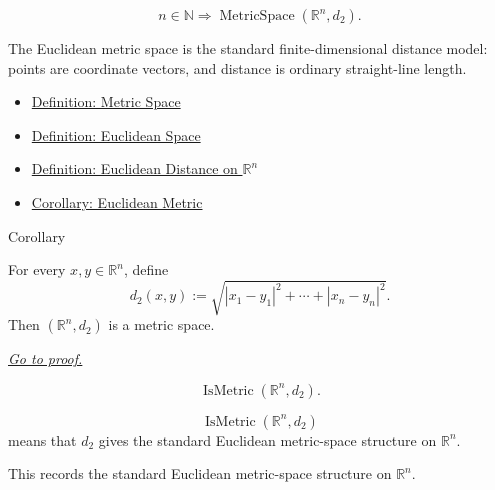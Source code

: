 \begin{remark*}
\[
n\in\mathbb{N}
\Longrightarrow
\operatorname{MetricSpace}(\mathbb{R}^n,d_2).
\]
\end{remark*}

\begin{remark*}[Interpretation]
The Euclidean metric space is the standard finite-dimensional distance model:
points are coordinate vectors, and distance is ordinary straight-line length.
\end{remark*}

\begin{dependencies}
\begin{itemize}
  \item \hyperref[def:metric-space]{Definition: Metric Space}
  \item \hyperref[def:euclidean-space]{Definition: Euclidean Space}
  \item \hyperref[def:euclidean-distance-rn]{Definition: Euclidean Distance on \(\mathbb{R}^n\)}
  \item \hyperref[cor:euclidean-metric]{Corollary: Euclidean Metric}
\end{itemize}
\end{dependencies}

\begin{corollarybox}{Corollary}
\begin{corollary}\label{cor:euclidean-metric}
For every \(x,y\in\mathbb{R}^n\), define
\[
  d_2(x,y):=\sqrt{|x_1-y_1|^2+\cdots+|x_n-y_n|^2}.
\]
Then \((\mathbb{R}^n,d_2)\) is a metric space.

\smallskip
\noindent
\hyperref[prf:euclidean-metric]{\textit{Go to proof.}}
\end{corollary}
\end{corollarybox}

\begin{remark*}
\[
\operatorname{IsMetric}(\mathbb{R}^n,d_2).
\]
\end{remark*}

\begin{remark*}
\[
\operatorname{IsMetric}(\mathbb{R}^n,d_2)
\]
means that \(d_2\) gives the standard Euclidean metric-space structure on
\(\mathbb{R}^n\).
\end{remark*}

\begin{remark*}[Interpretation]
This records the standard Euclidean metric-space structure on
\(\mathbb{R}^n\).
\end{remark*}

